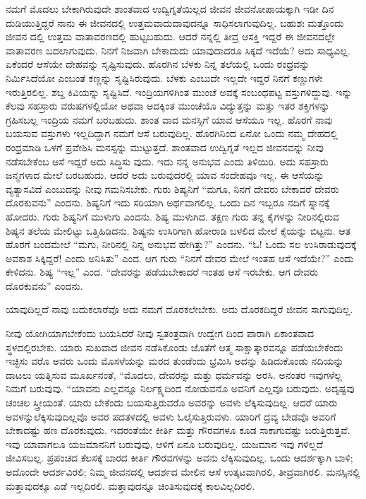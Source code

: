ನಮಗೆ ಮೊದಲು ಬೇಕಾಗಿರುವುದೇ ಶಾಂತವಾದ ಉದ್ವಿಗ್ನತೆಯಿಲ್ಲದ ಜೀವನ ಜೀವನೋಪಾಯಕ್ಕಾಗಿ ಇಡೀ ದಿನ ದುಡಿಯುತ್ತಿದ್ದರೆ ನಾನು ಈ ಜೀವನದಲ್ಲಿ ಉತ್ತಮವಾದುದಾವುದನ್ನೂ ಸಾಧಿಸಲಾಗುವುದಿಲ್ಲ. ಬಹುಶಃ ಮತ್ತೊಂದು ಜೀವನ ದಲ್ಲಿ ಉತ್ತಮ ವಾತಾವರಣದಲ್ಲಿ ಹುಟ್ಟಬಹುದು. ಆದರೆ ನನ್ನಲ್ಲಿ ತೀವ್ರ ಆಸಕ್ತಿ ಇದ್ದರೆ ಈ ಜೀವನದಲ್ಲೇ ವಾತಾವರಣ ಬದಲಾಗುವುದು. ನಿನಗೆ ನಿಜವಾಗಿ ಬೇಕಾದುದು ಯಾವುದಾದರೂ ಸಿಕ್ಕದೆ ಇದೆಯೆ? ಅದು ಸಾಧ್ಯವಿಲ್ಲ. ಏಕೆಂದರೆ ಆಸೆಯೇ ದೇಹವನ್ನು ಸೃಷ್ಟಿಸುವುದು. ಹೊರಗಿನ ಬೆಳಕು ನಿನ್ನ ತಲೆಯಲ್ಲಿ ಒಂದು ರಂಧ್ರವನ್ನು ನಿರ್ಮಿಸಿದೆಯೋ ಎಂಬಂತೆ ಕಣ್ಣನ್ನು ಸೃಷ್ಟಿಸಿರುವುದು. ಬೆಳಕು ಎಂಬುದೇ ಇಲ್ಲದೇ ಇದ್ದರೆ ನಿನಗೆ ಕಣ್ಣುಗಳೇ ಇರುತ್ತಿರಲಿಲ್ಲ. ಶಬ್ದ ಕಿವಿಯನ್ನು ಸೃಷ್ಟಿಸಿದೆ. ಇಂದ್ರಿಯಗಳಿಗಿಂತ ಮುಂಚೆ ಅವಕ್ಕೆ ಸಂಬಂಧಪಟ್ಟ ವಸ್ತುಗಳಿದ್ದುವು. ಇನ್ನು ಕೆಲವು ಸಹಸ್ರಾರು ವರುಷಗಳಲ್ಲಿಯೋ ಅಥವಾ ಅದಕ್ಕಿಂತ ಮುಂಚೆಯೊ ವಿದ್ಯುತ್ತನ್ನು ಮತ್ತು ಇತರ ಶಕ್ತಿಗಳನ್ನು ಗ್ರಹಿಸಬಲ್ಲ ಇಂದ್ರಿಯ ನಮಗೆ ಬರಬಹುದು. ಶಾಂತ ವಾದ ಮನಸ್ಸಿಗೆ ಯಾವ ಆಸೆಯೂ ಇಲ್ಲ. ಹೊರಗೆ ನಾವು ಬಯಸುವ ವಸ್ತುಗಳು ಇಲ್ಲದಿದ್ದಾಗ ನಮಗೆ ಆಸೆ ಬರುವುದಿಲ್ಲ. ಹೊರಗಿನಿಂದ ಏನೋ ಒಂದು ನಮ್ಮ ದೇಹದಲ್ಲಿ ರಂಧ್ರಮಾಡಿ ಒಳಗೆ ಪ್ರವೇಶಿಸಿ ಮನಸ್ಸನ್ನು ಮುಟ್ಟುತ್ತದೆ. ಶಾಂತವಾದ ಉದ್ವಿಗ್ನತೆ ಇಲ್ಲದ ಜೀವನವನ್ನು ನೀವು ನಡೆಸಬೇಕೆಂಬ ಆಸೆ ಇದ್ದರೆ ಅದು ಸಿದ್ಧಿಸು ವುದು. ಇದು ನನ್ನ ಅನುಭವ ಎಂದು ತಿಳಿಯಿರಿ. ಅದು ಸಹಸ್ರಾರು ಜನ್ಮಗಳಾದ ಮೇಲೆ ಬರಬಹುದು. ಆದರೆ ಅದು ಬರುವುದರಲ್ಲಿ ಯಾವ ಸಂದೇಹವೂ ಇಲ್ಲ. ಈ ಆಸೆಯನ್ನು ವ್ಯತ್ಯಾಸವಿದೆ ಎಂಬುದನ್ನು ನೀವು ಗಮನಿಸಬೇಕು. ಗುರು ಶಿಷ್ಯನಿಗೆ “ಮಗೂ, ನಿನಗೆ ದೇವರು ಬೇಕಾದರೆ ದೇವರು ದೊರಕುವನು” ಎಂದನು. ಶಿಷ್ಯನಿಗೆ ಇದು ಸರಿಯಾಗಿ ಅರ್ಥವಾಗಲಿಲ್ಲ. ಒಂದು ದಿನ ಇಬ್ಬರೂ ನದಿಗೆ ಸ್ನಾನಕ್ಕೆ ಹೋದರು. ಗುರು ಶಿಷ್ಯನಿಗೆ ಮುಳುಗು ಎಂದನು. ಶಿಷ್ಯ ಮುಳುಗಿದ. ತಕ್ಷಣ ಗುರು ತನ್ನ ಕೈಗಳನ್ನು ನೀರಿನಲ್ಲಿರುವ ಶಿಷ್ಯನ ತಲೆಯ ಮೇಲಿಟ್ಟು ಒತ್ತಿಹಿಡಿದನು. ಶಿಷ್ಯನು ಉಸಿರಿಗಾಗಿ ಹೋರಾಡಿ ಬಳಲಿದ ಮೇಲೆ ಕೈಯನ್ನು ಬಿಟ್ಟನು. ಆತ ಹೊರಗೆ ಬಂದಮೇಲೆ “ಮಗು, ನೀರಿನಲ್ಲಿ ನಿನ್ನ ಅನುಭವ ಹೇಗಿತ್ತು?” ಎಂದನು. “ಓ! ಒಂದು ಸಲ ಉಸಿರಾಡುವುದಕ್ಕೆ ಅವಕಾಶ ಸಿಕ್ಕಿದ್ದರೆ! ಎಂದು ಅನಿಸಿತು” ಎಂದ. ಆಗ ಗುರು “ನಿನಗೆ ದೇವರ ಮೇಲೆ ಇಂತಹ ಆಸೆ ಇದೆಯೇ?” ಎಂದು ಕೇಳಿದನು. ಶಿಷ್ಯ “ಇಲ್ಲ” ಎಂದ. “ದೇವರನ್ನು ಪಡೆಯಬೇಕಾದರೆ ಇಂತಹ ಆಸೆ ಇರಬೇಕು. ಆಗ ದೇವರು ದೊರಕುವನು” ಎಂದನು.

ಯಾವುದಿಲ್ಲದೆ ನಾವು ಬದುಕಲಾರೆವೊ ಅದು ನಮಗೆ ದೊರಕಲೇಬೇಕು. ಅದು ದೊರಕದಿದ್ದರೆ ಜೀವನ ಸಾಗುವುದಿಲ್ಲ.

ನೀವು ಯೋಗಿಯಾಗಬೇಕೆಂದು ಬಯಸಿದರೆ ನೀವು ಸ್ವತಂತ್ರವಾಗಿ ಉದ್ವೇಗ ದಿಂದ ಪಾರಾಗಿ ಏಕಾಂತವಾದ ಸ್ಥಳದಲ್ಲಿರಬೇಕು. ಯಾರು ಸುಖವಾದ ಜೀವನ ನಡೆಸಿಕೊಂಡು ಜೊತೆಗೆ ಆತ್ಮ ಸಾಕ್ಷಾತ್ಕಾರವನ್ನೂ ಪಡೆಯಬೇಕೆಂದು ಇಚ್ಛಿಸು ವರೊ ಅವರು ಒಂದು ಮೊಸಳೆಯನ್ನು ಮರದ ತುಂಡೆಂದು ಭ್ರಮಿಸಿ ಅದನ್ನು ಹಿಡಿದುಕೊಂಡು ನದಿಯನ್ನು ದಾಟಲು ಯತ್ನಿಸುವ ಮೂರ್ಖನಂತೆ, “ಮೊದಲು, ದೇವರನ್ನು ಮತ್ತು ಧರ್ಮವನ್ನು ಅರಸಿ. ಅನಂತರ ಇವುಗಳೆಲ್ಲ ನಿಮಗೆ ಬರುವುವು. “ಯಾವನು ಎಲ್ಲವನ್ನೂ ನಿರ್ಲಕ್ಷ್ಯದಿಂದ ನೋಡುವನೊ ಅವನಿಗೆ ಎಲ್ಲವೂ ಬರುವುದು. ಅದೃಷ್ಟವು ಚಂಚಲ ಸ್ತ್ರೀಯಂತೆ. ಯಾರು ಬೇಕೆಂದು ಬಯಸುತ್ತಿರುವರೊ ಅವರನ್ನು ಅವಳು ಲೆಕ್ಕಿಸುವುದಿಲ್ಲ. ಆದರೆ ಯಾರು ಅವಳನ್ನುಲೆಕ್ಕಿಸುವುದಿಲ್ಲವೊ ಅವರ ಪದತಳದಲ್ಲಿ ಅವಳು ಓಲೈಸುತ್ತಿರುವಳು. ಯಾರಿಗೆ ದ್ರವ್ಯ ಬೇಡವೊ ಅವರಿಗೆ ಬೇಕಾದಷ್ಟು ಹಣ ದೊರಕುವುದು. ಇದರಂತೆಯೇ ಕೀರ್ತಿ ಮತ್ತು ಗೌರವಗಳೂ ಕೂಡ ಸಾಕಾಗುವಷ್ಟು ಬರುತ್ತಿರುತ್ತವೆ. ಇವು ಯಾವಾಗಲೂ ಯಜಮಾನನಿಗೆ ಬರುವುವು, ಆಳಿಗೆ ಏನೂ ಬರುವುದಿಲ್ಲ. ಯಜಮಾನ ಇವು ಗಳಿಲ್ಲದೆ ಜೀವಿಸಬಲ್ಲ. ಪ್ರಪಂಚದ ಕೆಲಸಕ್ಕೆ ಬಾರದ ಕೀರ್ತಿ ಗೌರವಗಳನ್ನು ಅವನು ಲೆಕ್ಕಿಸುವುದಿಲ್ಲ. ಒಂದು ಆದರ್ಶಕ್ಕಾಗಿ ಬಾಳಿ; ಅದೊಂದೇ ಆದರ್ಶವಿರಲಿ; ನಿಮ್ಮ ಜೀವನದಲ್ಲಿ ಆದರ್ಶದ ಮೇಲಿನ ಆಸೆ ಉತ್ಕಟವಾಗಿರಲಿ, ತೀವ್ರವಾಗಿರಲಿ. ಮನಸ್ಸಿನಲ್ಲಿ ಮತ್ತಾವುದಕ್ಕೂ ಎಡೆ ಇಲ್ಲದಿರಲಿ. ಮತ್ತಾವುದನ್ನೂ ಚಿಂತಿಸುವುದಕ್ಕೆ ಕಾಲವಿಲ್ಲದಿರಲಿ.

